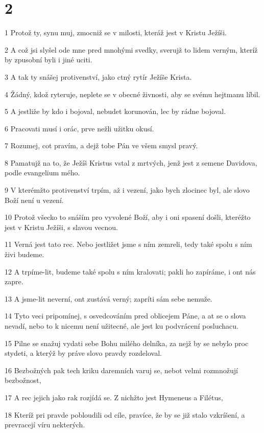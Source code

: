 \chapter{2}

\par 1 Protož ty, synu muj, zmocniž se v milosti, kteráž jest v Kristu Ježíši.
\par 2 A což jsi slyšel ode mne pred mnohými svedky, sverujž to lidem verným, kteríž by zpusobní byli i jiné uciti.
\par 3 A tak ty snášej protivenství, jako ctný rytír Ježíše Krista.
\par 4 Žádný, kdož ryteruje, neplete se v obecné živnosti, aby se svému hejtmanu líbil.
\par 5 A jestliže by kdo i bojoval, nebudet korunován, lec by rádne bojoval.
\par 6 Pracovati musí i orác, prve nežli užitku okusí.
\par 7 Rozumej, cot pravím, a dejž tobe Pán ve všem smysl pravý.
\par 8 Pamatujž na to, že Ježíš Kristus vstal z mrtvých, jenž jest z semene Davidova, podle evangelium mého.
\par 9 V kterémžto protivenství trpím, až i vezení, jako bych zlocinec byl, ale slovo Boží není u vezení.
\par 10 Protož všecko to snáším pro vyvolené Boží, aby i oni spasení došli, kteréžto jest v Kristu Ježíši, s slavou vecnou.
\par 11 Verná jest tato rec. Nebo jestližet jsme s ním zemreli, tedy také spolu s ním živi budeme.
\par 12 A trpíme-lit, budeme také spolu s ním kralovati; pakli ho zapíráme, i ont nás zapre.
\par 13 A jsme-lit neverní, ont zustává verný; zapríti sám sebe nemuže.
\par 14 Tyto veci pripomínej, s osvedcováním pred oblicejem Páne, a at se o slova nevadí, nebo to k nicemu není užitecné, ale jest ku podvrácení posluchacu.
\par 15 Pilne se snažuj vydati sebe Bohu milého delníka, za nejž by se nebylo proc stydeti, a kterýž by práve slovo pravdy rozdeloval.
\par 16 Bezbožných pak tech kriku daremních varuj se, nebot velmi rozmnožují bezbožnost,
\par 17 A rec jejich jako rak rozjídá se. Z nichžto jest Hymeneus a Filétus,
\par 18 Kteríž pri pravde pobloudili od cíle, pravíce, že by se již stalo vzkríšení, a prevracejí víru nekterých.

